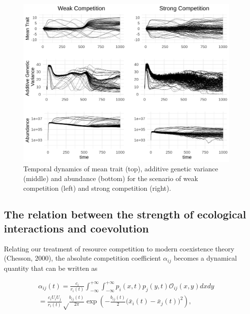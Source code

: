 \documentclass[]{elsarticle} %
\begin{document}
\begin{figure}

{\centering \includegraphics[width=1\linewidth]{community_dynamics} 

}

\caption{\label{temporal}Temporal dynamics of mean trait (top), additive genetic variance (middle) and abundance (bottom) for the scenario of weak competition (left) and strong competition (right).}\label{fig:unnamed-chunk-6}
\end{figure}

\hypertarget{the-relation-between-the-strength-of-ecological-interactions-and-coevolution}{%
\subsection{\texorpdfstring{The relation between the strength of
ecological interactions and coevolution
\label{ecoevo}}{The relation between the strength of ecological interactions and coevolution }}\label{the-relation-between-the-strength-of-ecological-interactions-and-coevolution}}

Relating our treatment of resource competition to modern coexistence
theory (Chesson, 2000), the absolute competition coefficient
\(\alpha_{ij}\) becomes a dynamical quantity that can be written as

\begin{multline}
\alpha_{ij}(t)=\frac{c_i}{r_i(t)}\int_{-\infty}^{+\infty}\int_{-\infty}^{+\infty}p_i(x,t)p_j(y,t)\mathcal O_{ij}(x,y) dxdy \\ =\frac{c_iU_iU_j}{r_i(t)}\sqrt\frac{b_{ij}(t)}{2\pi}\exp\left(-\frac{b_{ij}(t)}{2}\big(\bar x_i(t)-\bar x_j(t)\big)^2\right),
\end{multline}
\end{document}
